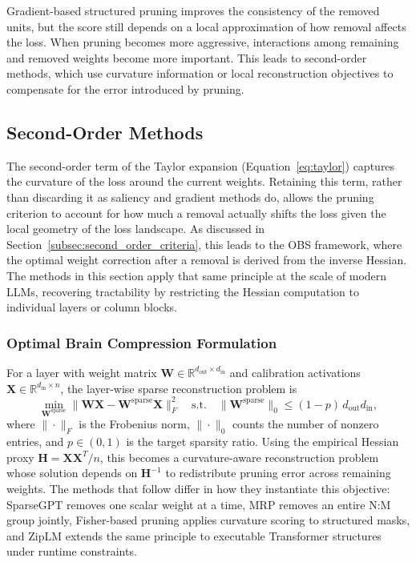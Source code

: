 Gradient-based structured pruning improves the consistency of the removed units, but the score still depends on a local approximation of how removal affects the loss. When pruning becomes more aggressive, interactions among remaining and removed weights become more important. This leads to second-order methods, which use curvature information or local reconstruction objectives to compensate for the error introduced by pruning.

\subsection{Second-Order Methods}

The second-order term of the Taylor expansion (Equation~\eqref{eq:taylor})
captures the curvature of the loss around the current weights. Retaining this
term, rather than discarding it as saliency and gradient methods do, allows the
pruning criterion to account for how much a removal actually shifts the loss
given the local geometry of the loss landscape. As discussed in
Section~\ref{subsec:second_order_criteria}, this leads to the OBS framework,
where the optimal weight correction after a removal is derived from the inverse
Hessian. The methods in this section apply that same principle at the scale of
modern LLMs, recovering tractability by restricting the Hessian computation to
individual layers or column blocks.

\subsubsection{Optimal Brain Compression Formulation}

For a layer with weight matrix $\mathbf{W} \in \mathbb{R}^{d_{\text{out}} \times d_{\text{in}}}$ and calibration activations $\mathbf{X} \in \mathbb{R}^{d_{\text{in}} \times n}$, the layer-wise sparse reconstruction problem is
\begin{equation}
	\min_{\mathbf{W}^{\text{sparse}}}
	\|\mathbf{W}\mathbf{X} - \mathbf{W}^{\text{sparse}}\mathbf{X}\|_F^2
	\quad \text{s.t.} \quad
	\|\mathbf{W}^{\text{sparse}}\|_0 \leq (1-p)\, d_{\text{out}} d_{\text{in}},
\end{equation}
where $\|\cdot\|_F$ is the Frobenius norm, $\|\cdot\|_0$ counts the number of nonzero entries, and $p \in (0,1)$ is the target sparsity ratio. Using the empirical Hessian proxy $\mathbf{H} = \mathbf{X}\mathbf{X}^T / n$, this becomes a curvature-aware reconstruction problem whose solution depends on $\mathbf{H}^{-1}$ to redistribute pruning error across remaining weights. The methods that follow differ in how they instantiate this objective: SparseGPT removes one scalar weight at a time, MRP removes an entire N:M group jointly, Fisher-based pruning applies curvature scoring to structured masks, and ZipLM extends the same principle to executable Transformer structures under runtime constraints.

